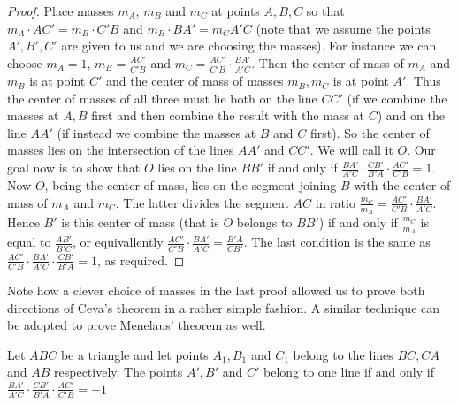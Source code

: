 \begin{proof}
Place masses $m_A$, $m_B$ and $m_C$ at points $A,B,C$ so that $m_A\cdot AC' = m_B \cdot C'B$ and $m_B\cdot BA'=m_C A'C$ (note that we assume the points $A',B',C'$ are given to us and we are choosing the masses). For instance we can choose $m_A=1$, $m_B=\frac{AC'}{C'B}$ and $m_C=\frac{AC'}{C'B}\cdot\frac{BA'}{A'C}$. Then the center of mass of $m_A$ and $m_B$ is at point $C'$ and the center of mass of masses $m_B,m_C$ is at point $A'$. Thus the center of masses of all three must lie both on the line $CC'$ (if we combine the masses at $A,B$ first and then combine the result with the mass at $C$) and on the line $AA'$ (if instead we combine the masses at $B$ and $C$ first). So the center of masses lies on the intersection of the lines $AA'$ and $CC'$. We will call it $O$. Our goal now is to show that $O$ lies on the line $BB'$ if and only if $\frac{BA'}{A'C}\cdot\frac{CB'}{B'A}\cdot\frac{AC'}{C'B}=1$.
Now $O$, being the center of mass, lies on the segment joining $B$ with the center of mass of $m_A$ and $m_C$. The latter divides the segment $AC$ in ratio $\frac{m_C}{m_A}=\frac{AC'}{C'B}\cdot\frac{BA'}{A'C}$.
Hence $B'$ is this center of mass (that is $O$ belongs to $BB'$) if and only if $\frac{m_C}{m_A}$ is equal to $\frac{AB'}{B'C}$, or equivallently $\frac{AC'}{C'B}\cdot\frac{BA'}{A'C}=\frac{B'A}{CB'}$. The last condition is the same as $\frac{AC'}{C'B}\cdot\frac{BA'}{A'C}\cdot\frac{CB'}{B'A}=1$, as required.
\end{proof}
Note how a clever choice of masses in the last proof allowed us to prove both directions of Ceva's theorem in a rather simple fashion.
A similar technique can be adopted to prove Menelaus' theorem as well.
\begin{theorem}
Let $ABC$ be a triangle and let points $A_1,B_1$ and $C_1$ belong to the lines $BC, CA$ and $AB$ respectively.
The points $A', B'$ and $C'$ belong to one line if and only if $\frac{BA'}{A'C}\cdot\frac{CB'}{B'A}\cdot\frac{AC'}{C'B}=-1$
\end{theorem}
